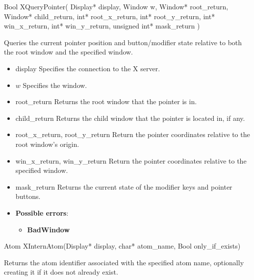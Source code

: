 \documentclass{report}
\begin{document}
\begin{itemize}
            \begin{cppcode}
                Bool XQueryPointer(
                    Display* display,
                    Window w,
                    Window* root_return, Window* child_return,
                    int* root_x_return, int* root_y_return,
                    int* win_x_return, int* win_y_return,
                    unsigned int* mask_return
                )
            \end{cppcode}
            \bigbreak \noindent
            Queries the current pointer position and button/modifier state relative to both the root window and the specified window.

            \begin{itemize}
                \item display Specifies the connection to the X server.
                \item $w$ Specifies the window.
                \item root\_return Returns the root window that the pointer is in.
                \item child\_return Returns the child window that the pointer is located in, if any.
                \item root\_x\_return, root\_y\_return Return the pointer coordinates relative to the root window’s origin.
                \item win\_x\_return, win\_y\_return Return the pointer coordinates relative to the specified window.
                \item mask\_return Returns the current state of the modifier keys and pointer buttons.
            \end{itemize}

            \begin{itemize}
                \item \textbf{Possible errors}:
                    \begin{itemize}
                        \item \textbf{BadWindow}
                    \end{itemize}
            \end{itemize}

            \begin{cppcode}
            Atom XInternAtom(Display* display, char* atom_name, Bool only_if_exists)
            \end{cppcode}
            \bigbreak \noindent
            Returns the atom identifier associated with the specified atom name, optionally creating it if it does not already exist.


\end{itemize}
\end{document}
